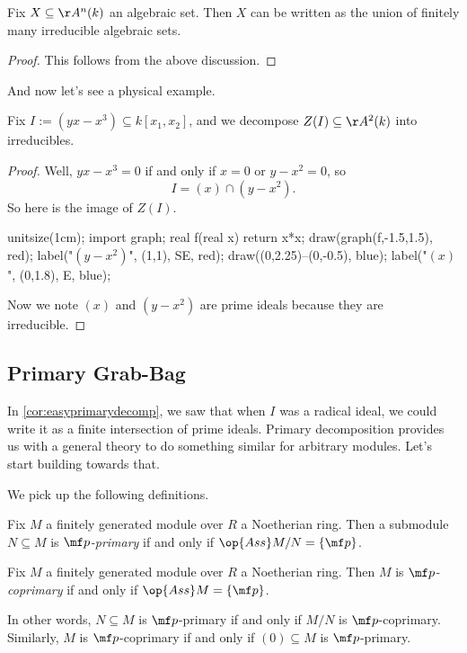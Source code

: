\begin{corollary}
	Fix $X\subseteq\AA^n(k)$ an algebraic set. Then $X$ can be written as the union of finitely many irreducible algebraic sets.
\end{corollary}
\begin{proof}
	This follows from the above discussion.
\end{proof}
And now let's see a physical example.
\begin{exe}
	Fix $I:=\left(yx-x^3\right)\subseteq k[x_1,x_2]$, and we decompose $Z(I)\subseteq\AA^2(k)$ into irreducibles.
\end{exe}
\begin{proof}
	Well, $yx-x^3=0$ if and only if $x=0$ or $y-x^2=0$, so
	\[I=(x)\cap\left(y-x^2\right).\]
	So here is the image of $Z(I)$.
	\begin{center}
		\begin{asy}
			unitsize(1cm);
			import graph;
			real f(real x)
			{
				return x*x;
			}
			draw(graph(f,-1.5,1.5), red);
			label("$\left(y-x^2\right)$", (1,1), SE, red);
			draw((0,2.25)--(0,-0.5), blue);
			label("$(x)$", (0,1.8), E, blue);
		\end{asy}
	\end{center}
	Now we note $(x)$ and $\left(y-x^2\right)$ are prime ideals because they are irreducible.
\end{proof}

\subsection{Primary Grab-Bag}
In \autoref{cor:easyprimarydecomp}, we saw that when $I$ was a radical ideal, we could write it as a finite intersection of prime ideals. Primary decomposition provides us with a general theory to do something similar for arbitrary modules. Let's start building towards that.

We pick up the following definitions.
\begin{definition}
	Fix $M$ a finitely generated module over $R$ a Noetherian ring. Then a submodule $N\subseteq M$ is \textit{$\mf p$-primary} if and only if $\op{Ass}M/N=\{\mf p\}$.
\end{definition}
\begin{definition}
	Fix $M$ a finitely generated module over $R$ a Noetherian ring. Then $M$ is \textit{$\mf p$-coprimary} if and only if $\op{Ass}M=\{\mf p\}$.
\end{definition}
In other words, $N\subseteq M$ is $\mf p$-primary if and only if $M/N$ is $\mf p$-coprimary. Similarly, $M$ is $\mf p$-coprimary if and only if $(0)\subseteq M$ is $\mf p$-primary.

